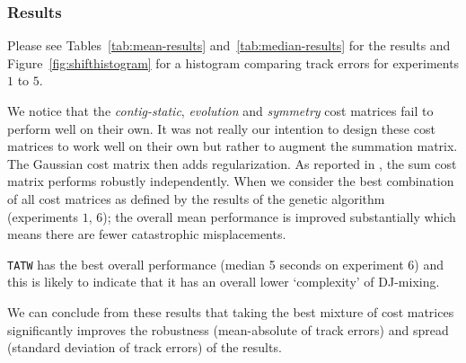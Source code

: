\documentclass[twocolumn]{article}
\begin{document}
\subsubsection{Results}\label{sec:results}

Please see Tables~\ref{tab:mean-results} and~\ref{tab:median-results} for the results and Figure~\ref{fig:shifthistogram} for a histogram comparing track errors for experiments $1$ to $5$.

We notice that the \textit{contig-static}, \textit{evolution} and \textit{symmetry} cost matrices fail to perform well on their own. It was not really our intention to design these cost matrices to work well on their own but rather to augment the summation matrix. The Gaussian cost matrix then adds regularization. As reported in \cite{scarfe2013long}, the sum cost matrix performs robustly independently. When we consider the best combination of all cost matrices as defined by the results of the genetic algorithm (experiments $1$, $6$); the overall mean performance is improved substantially which means there are fewer catastrophic misplacements. 

\texttt{TATW} has the best overall performance (median 5 seconds on experiment $6$) and this is likely to indicate that it has an overall lower `complexity' of DJ-mixing.

We can conclude from these results that taking the best mixture of cost matrices significantly improves the robustness (mean-absolute of track errors) and spread (standard deviation of track errors) of the results. 
\end{document}
